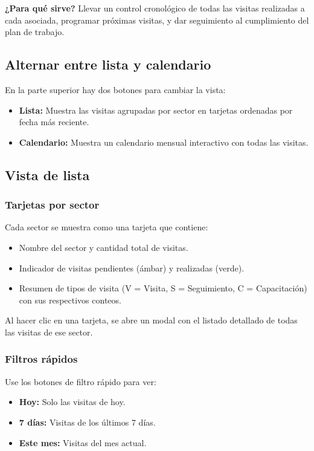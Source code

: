 \documentclass[12pt]{article}
\begin{document}
\begin{infobox}
  \textbf{¿Para qué sirve?} Llevar un control cronológico de todas las visitas realizadas a cada asociada, programar próximas visitas, y dar seguimiento al cumplimiento del plan de trabajo.
\end{infobox}

\subsection{Alternar entre lista y calendario}
En la parte superior hay dos botones para cambiar la vista:

\begin{itemize}[nosep]
  \item \textbf{Lista:} Muestra las visitas agrupadas por sector en tarjetas ordenadas por fecha más reciente.
  \item \textbf{Calendario:} Muestra un calendario mensual interactivo con todas las visitas.
\end{itemize}

\subsection{Vista de lista}

\subsubsection{Tarjetas por sector}
Cada sector se muestra como una tarjeta que contiene:
\begin{itemize}[nosep]
  \item Nombre del sector y cantidad total de visitas.
  \item Indicador de visitas pendientes (ámbar) y realizadas (verde).
  \item Resumen de tipos de visita (V = Visita, S = Seguimiento, C = Capacitación) con sus respectivos conteos.
\end{itemize}

Al hacer clic en una tarjeta, se abre un modal con el listado detallado de todas las visitas de ese sector.

\subsubsection{Filtros rápidos}
Use los botones de filtro rápido para ver:
\begin{itemize}[nosep]
  \item \textbf{Hoy:} Solo las visitas de hoy.
  \item \textbf{7 días:} Visitas de los últimos 7 días.
  \item \textbf{Este mes:} Visitas del mes actual.
\end{itemize}
\end{document}
